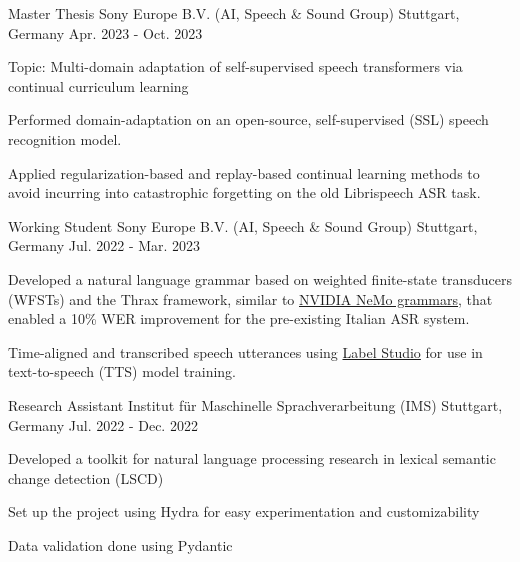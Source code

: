 

\begin{cventries}

  \cventry
    {Master Thesis}
    {Sony Europe B.V. (AI, Speech \& Sound Group)} %
    {Stuttgart, Germany} %
    {Apr. 2023 - Oct. 2023} %
    {
      \begin{cvitems} %
        \item Topic: Multi-domain adaptation of self-supervised speech transformers via continual curriculum learning %
        \item Performed domain-adaptation on an open-source, self-supervised (SSL) speech recognition model.
        \item Applied regularization-based and replay-based continual learning methods to avoid incurring into catastrophic forgetting on the old Librispeech ASR task.
      \end{cvitems}
    }

  \cventry
    {Working Student} %
    {Sony Europe B.V. (AI, Speech \& Sound Group)} %
    {Stuttgart, Germany} %
    {Jul. 2022 - Mar. 2023} %
    {
      \begin{cvitems} %
        \item Developed a natural language grammar based on weighted finite-state transducers (WFSTs) and the Thrax framework, similar to \href{https://github.com/NVIDIA/NeMo-text-processing}{NVIDIA NeMo grammars}, that enabled a 10\% WER improvement for the pre-existing Italian ASR system.
        \item Time-aligned and transcribed speech utterances using \href{https://labelstud.io/}{Label Studio} for use in text-to-speech (TTS) model training.
      \end{cvitems}
    }

  \cventry
    {Research Assistant} %
    {Institut für Maschinelle Sprachverarbeitung (IMS)} %
    {Stuttgart, Germany} %
    {Jul. 2022 - Dec. 2022} %
    {
      \begin{cvitems} %
        \item Developed a toolkit for natural language processing research in lexical semantic change detection (LSCD)
        \item Set up the project using Hydra for easy experimentation and customizability
        \item Data validation done using Pydantic
      \end{cvitems}
    }


\end{cventries}
